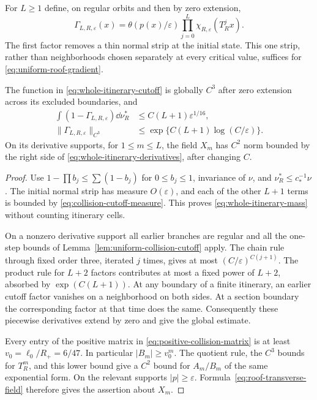For $L\ge1$ define, on regular orbits and then by zero extension,
\begin{equation}\label{eq:whole-itinerary-cutoff}
 \Gamma_{L,R,\varepsilon}(x)
  =\theta(p(x)/\varepsilon)
                    \prod_{j=0}^{L}\chi_{R,\varepsilon}(T_R^jx).
\end{equation}
The first factor removes a thin normal strip at the initial state.
This one strip, rather than neighborhoods chosen separately at every
critical value, suffices for \eqref{eq:uniform-roof-gradient}.

\begin{lemma}\label{lem:whole-itinerary-cutoff}
The function in \eqref{eq:whole-itinerary-cutoff} is globally $C^3$
after zero extension across its excluded boundaries, and
\begin{align}
 \int(1-\Gamma_{L,R,\varepsilon})\dd\nu_R^*
          &\le C(L+1)\varepsilon^{1/16},
             \label{eq:whole-itinerary-mass}\\
 \|\Gamma_{L,R,\varepsilon}\|_{C^3}
          &\le \exp\{C(L+1)\log(C/\varepsilon)\}.
             \label{eq:whole-itinerary-derivatives}
\end{align}
On its derivative supports, for $1\le m\le L$, the field $X_m$ has
$C^2$ norm bounded by the right side of
\eqref{eq:whole-itinerary-derivatives}, after changing $C$.
\end{lemma}
\begin{proof}
Use $1-\prod b_j\le\sum(1-b_j)$ for $0\le b_j\le1$, invariance of
$\nu$, and $\nu_R^*\le c_*^{-1}\nu$. The initial normal strip has
measure $O(\varepsilon)$, and each of the other $L+1$ terms is bounded
by \eqref{eq:collision-cutoff-measure}. This proves
\eqref{eq:whole-itinerary-mass} without counting itinerary cells.

On a nonzero derivative support all earlier branches are regular and
all the one-step bounds of Lemma~\ref{lem:uniform-collision-cutoff}
apply. The chain rule through fixed order three, iterated $j$ times,
gives at most $(C/\varepsilon)^{C(j+1)}$. The product rule for $L+2$
factors contributes at most a fixed power of $L+2$, absorbed by
$\exp(C(L+1))$. At any boundary of a finite itinerary, an earlier
cutoff factor vanishes on a neighborhood on both sides. At a section
boundary the corresponding factor at that time does the same.
Consequently these piecewise derivatives extend by zero and give the
global estimate.

Every entry of the positive matrix in
\eqref{eq:positive-collision-matrix} is at least
$v_0=\ell_0/R_+=6/47$. In particular $|B_m|\ge v_0^m$. The quotient
rule, the $C^3$ bounds for $T_R^m$, and this lower bound give a
$C^2$ bound for $A_m/B_m$ of the same exponential form. On the relevant
supports $|p|\ge\varepsilon$. Formula~\eqref{eq:roof-transverse-field}
therefore gives the assertion about $X_m$.
\end{proof}

